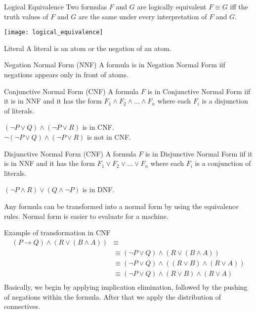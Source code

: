 \documentclass{article}
\begin{document}
\begin{Definition}{Logical Equivalence}{}
   Two formulas $F$ and $G$ are logically equivalent $F\equiv G$ iff the truth
   values of $F$ and $G$ are the same under every interpretation of $F$ and
   $G$.
\end{Definition}
\begin{center}
    \texttt{[image: logical\_equivalence]}
\end{center}
\begin{Definition}{Literal}{}
   A literal is an atom or the negation of an atom.  
\end{Definition}
\begin{Definition}{Negation Normal Form (NNF)}{}
   A formula is in Negation Normal Form iif negations appears only in front
   of atoms.
\end{Definition}
\begin{Definition}{Conjunctive Normal Form (CNF)}{}
   A formula $F$ is in Conjunctive Normal Form iif it is in NNF and it has the
   form $F_1\land F_2\land\ldots\land F_n$ where each $F_i$ is a disjunction of
   literals.
\end{Definition}
\begin{example}
    $(\neg P\lor Q)\land(\neg P\lor R)$ is in CNF.\\
    $\neg(\neg P\lor Q)\land(\neg P\lor R)$ is not in CNF.
\end{example}
\begin{Definition}{Disjunctive Normal Form (CNF)}{}
   A formula $F$ is in Disjunctive Normal Form iif it is in NNF and it has the
   form $F_1\lor F_2\lor\ldots\lor F_n$ where each $F_i$ is a conjunction of
   literals.
\end{Definition}
\begin{example}
   $(\neg P\land R)\lor(Q\land\neg P)$ is in DNF.
\end{example}
Any formula can be transformed into a normal form by using the equivalence
rules. Normal form is easier to evaluate for a machine.
\begin{exam}
    Example of transformation in CNF
    $$
    \begin{aligned}
        (P\rightarrow Q)\land(R\lor(B\land A)) &\equiv \\ 
                                               &\equiv(\neg P\lor
                                               Q)\land(R\lor(B\land A))\\
                                               &\equiv (\neg P\lor
                                               Q)\land((R\lor B)\land (R\lor
                                               A))\\
                                               &\equiv (\neg P\lor
                                               Q)\land(R\lor B)\land (R\lor
                                               A)\\
    \end{aligned}
    $$
    Basically, we begin by applying implication elimination, followed by the
    pushing of negations within the formula. After that we apply the
    distribution of connectives.
\end{exam}
\end{document}
